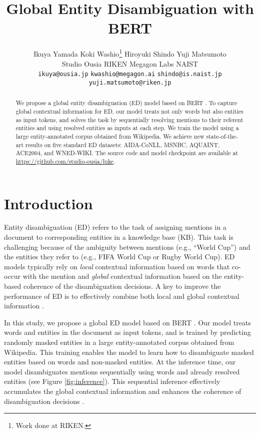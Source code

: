 \documentclass[11pt]{article}
\title{Global Entity Disambiguation with BERT}
\author{
    Ikuya Yamada\qquad
    Koki Washio\thanks{\hspace{2mm}Work done at RIKEN.}\qquad
    Hiroyuki Shindo\qquad
    Yuji Matsumoto\\
    Studio Ousia \quad
    RIKEN \quad
    Megagon Labs \quad
    NAIST\\
    \texttt{ikuya@ousia.jp} \quad 
    \texttt{kwashio@megagon.ai} \quad 
    \texttt{shindo@is.naist.jp} \\
    \texttt{yuji.matsumoto@riken.jp} \\ 
}
\begin{document}
\maketitle
\begin{abstract}
  We propose a global entity disambiguation (ED) model based on BERT \cite{devlin2018bert}.
  To capture global contextual information for ED, our model treats not only words but also entities as input tokens, and solves the task by sequentially resolving mentions to their referent entities and using resolved entities as inputs at each step.
  We train the model using a large entity-annotated corpus obtained from Wikipedia.
  We achieve new state-of-the-art results on five standard ED datasets: AIDA-CoNLL, MSNBC, AQUAINT, ACE2004, and WNED-WIKI.
  The source code and model checkpoint are available at \url{https://github.com/studio-ousia/luke}.
\end{abstract}

\section{Introduction}

Entity disambiguation (ED) refers to the task of assigning mentions in a document to corresponding entities in a knowledge base (KB).
This task is challenging because of the ambiguity between mentions (e.g., ``World Cup'') and the entities they refer to (e.g., FIFA World Cup or Rugby World Cup).
ED models typically rely on \textit{local} contextual information based on words that co-occur with the mention and \textit{global} contextual information based on the entity-based coherence of the disambiguation decisions.
A key to improve the performance of ED is to effectively combine both local and global contextual information \cite{ganea-hofmann:2017:EMNLP2017,le-titov-2018-improving}.

In this study, we propose a global ED model based on BERT \cite{devlin2018bert}.
Our model treats words and entities in the document as input tokens, and is trained by predicting randomly masked entities in a large entity-annotated corpus obtained from Wikipedia.
This training enables the model to learn how to disambiguate masked entities based on words and non-masked entities.
At the inference time, our model disambiguates mentions sequentially using words and already resolved entities (see Figure \ref{fig:inference}).
This sequential inference effectively accumulates the global contextual information and enhances the coherence of disambiguation decisions \cite{yang2019learning}.
\end{document}
